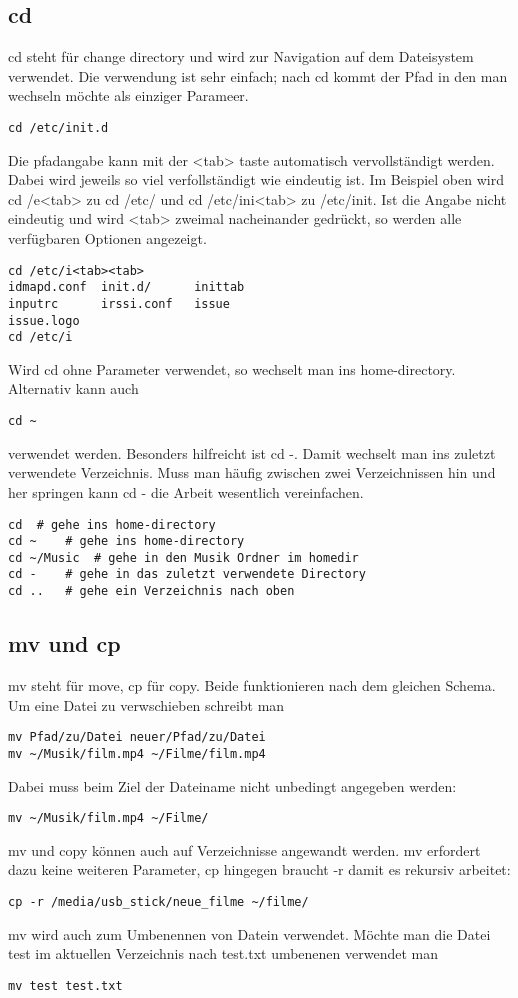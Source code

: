 \documentclass[10pt,paper=a4,final]{scrartcl}
\begin{document}
\subsection{cd}
cd steht f\"ur change directory und wird zur Navigation auf dem Dateisystem verwendet. Die verwendung ist sehr einfach; nach cd kommt der Pfad in den man wechseln m\"ochte als einziger Parameer.
\begin{lstlisting}[frame=single]
cd /etc/init.d
\end{lstlisting}
Die pfadangabe kann mit der <tab> taste automatisch vervollst\"andigt werden. Dabei wird jeweils so viel verfollst\"andigt wie eindeutig ist. Im Beispiel oben wird cd /e<tab> zu cd /etc/ und cd /etc/ini<tab> zu /etc/init. Ist die Angabe nicht eindeutig und wird <tab> zweimal nacheinander gedr\"uckt, so werden alle verf\"ugbaren Optionen angezeigt.
\begin{lstlisting}[frame=single]
cd /etc/i<tab><tab>
idmapd.conf  init.d/      inittab
inputrc      irssi.conf   issue
issue.logo
cd /etc/i
\end{lstlisting}
Wird cd ohne Parameter verwendet, so wechselt man ins home-directory. Alternativ kann auch
\begin{lstlisting}[frame=single]
cd ~
\end{lstlisting}
verwendet werden. Besonders hilfreicht ist cd -. Damit wechselt man ins zuletzt verwendete Verzeichnis. Muss man h\"aufig zwischen zwei Verzeichnissen hin und her springen kann cd - die Arbeit wesentlich vereinfachen.
\begin{lstlisting}[frame=single]
cd	# gehe ins home-directory
cd ~	# gehe ins home-directory
cd ~/Music	# gehe in den Musik Ordner im homedir
cd -	# gehe in das zuletzt verwendete Directory
cd ..	# gehe ein Verzeichnis nach oben
\end{lstlisting}
\subsection{mv und cp}
mv steht f\"ur move, cp f\"ur copy. Beide funktionieren nach dem gleichen Schema. Um eine Datei zu verwschieben schreibt man
\begin{lstlisting}[frame=single]
mv Pfad/zu/Datei neuer/Pfad/zu/Datei
mv ~/Musik/film.mp4 ~/Filme/film.mp4
\end{lstlisting}
Dabei muss beim Ziel der Dateiname nicht unbedingt angegeben werden:
\begin{lstlisting}[frame=single]
mv ~/Musik/film.mp4 ~/Filme/
\end{lstlisting}
mv und copy k\"onnen auch auf Verzeichnisse angewandt werden. mv erfordert dazu keine weiteren Parameter, cp hingegen braucht -r damit es rekursiv arbeitet:
\begin{lstlisting}[frame=single]
cp -r /media/usb_stick/neue_filme ~/filme/
\end{lstlisting}
mv wird auch zum Umbenennen von Datein verwendet. M\"ochte man die Datei test im aktuellen Verzeichnis nach test.txt umbenenen verwendet man
\begin{lstlisting}[frame=single]
mv test test.txt
\end{lstlisting}
\end{document}
